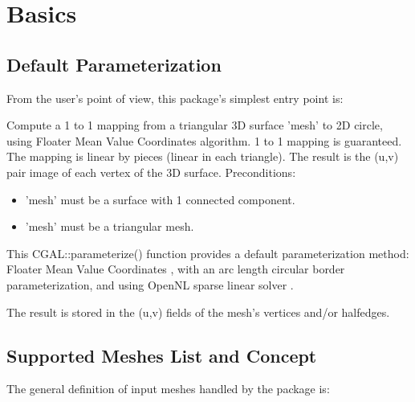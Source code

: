 \section{Basics}


\subsection{Default Parameterization}

From the user's point of view, this package's simplest entry point is:

{
Compute a 1 to 1 mapping from a triangular 3D surface 'mesh' to 2D circle, using
Floater Mean Value Coordinates algorithm. 1 to 1 mapping is guaranteed.
The mapping is linear by pieces (linear in each triangle). The result is the (u,v) pair image of each vertex of the 3D surface.
Preconditions:\begin{itemize}
\item 'mesh' must be a surface with 1 connected component.\item 'mesh' must be a triangular mesh.\end{itemize}
}

This CGAL::parameterize() function provides a default parameterization method:
Floater Mean Value Coordinates \cite{cgal:f-mvc-03}, with an arc length circular border
parameterization, and using OpenNL sparse linear solver \cite{cgal:l-nmdgp-05}.

The result is stored in the (u,v) fields of the mesh's vertices and/or halfedges.


\subsection{Supported Meshes List and Concept}

The general definition of input meshes handled by the package is:

